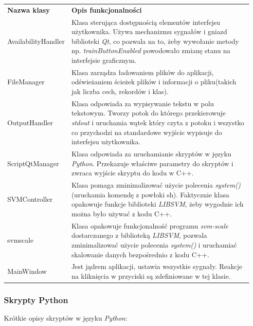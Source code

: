 \documentclass[paper=a4, fontsize=11pt]{scrartcl} %
\numberwithin{equation}{section} %
\numberwithin{figure}{section} %
\begin{document}
    \begingroup
    \setlength{\tabcolsep}{10pt} %
    \renewcommand{\arraystretch}{1.5}
    \begin{tabular}{p{}p{}} %
        \textbf{Nazwa klasy} & \textbf{Opis funkcjonalności} \\ %
        AvailabilityHandler &  
        Klasa sterująca dostępnością elementów interfejsu użytkownika. Używa mechanizmu
        sygnałów i gniazd biblioteki \textit{Qt}, co pozwala na to, żeby wywołanie metody np.
        \textit{trainButtonEnabled} powodowało zmianę stanu na interfejsie graficznym. 
        \\ %
        FileManager & 
        Klasa zarządza ładowaniem plików do aplikacji, odświeżaniem ścieżek plików i informacji
        o pliku(takich jak liczba cech, rekordów i klas).
        \\ %
        OutputHandler &
        Klasa odpowiada za wypisywanie tekstu w polu tekstowym. Tworzy potok do którego
        przekierowuje \textit{stdout} i uruchamia wątek który czyta z potoku i wszystko co
        przychodzi na standardowe wyjście wypisuje do interfejsu użytkownika.
        \\ %
        ScriptQtManager & 
        Klasa odpowiada za uruchamianie skryptów w języku \textit{Python}. Przekazuje
        właściwe parametry do skryptów i zwraca wyjście skryptu do kodu w C++.
        \\ %
        SVMController &
        Klasa pomaga zminimalizować użycie polecenia \textit{system()}(uruchamia komendę z
        powłoki sh). Faktycznie klasa opakowuje funkcje biblioteki \textit{LIBSVM}, żeby
        wygodnie ich można było używać z kodu C++.
        \\ %
        svmscale &
        Klasa opakowuje funkcjonalność programu \textit{svm-scale} dostarczanego z biblioteką
        \textit{LIBSVM}, pozwala zminimalizować użycie polecenia \textit{system()} i uruchamiać
        skalowanie danych bezpośrednio z kodu C++.
        \\ %
        MainWindow & 
        Jest jądrem aplikacji, ustawia wszystkie sygnały. Reakcje na kliknięcia w przyciski są
        zdefiniowane w tej klasie. 
        \\ %
    \end{tabular}
    \endgroup

    \newpage
\subsubsection{Skrypty Python}
    Krótkie opisy skryptów w języku \textit{Python}: \\
\end{document}
